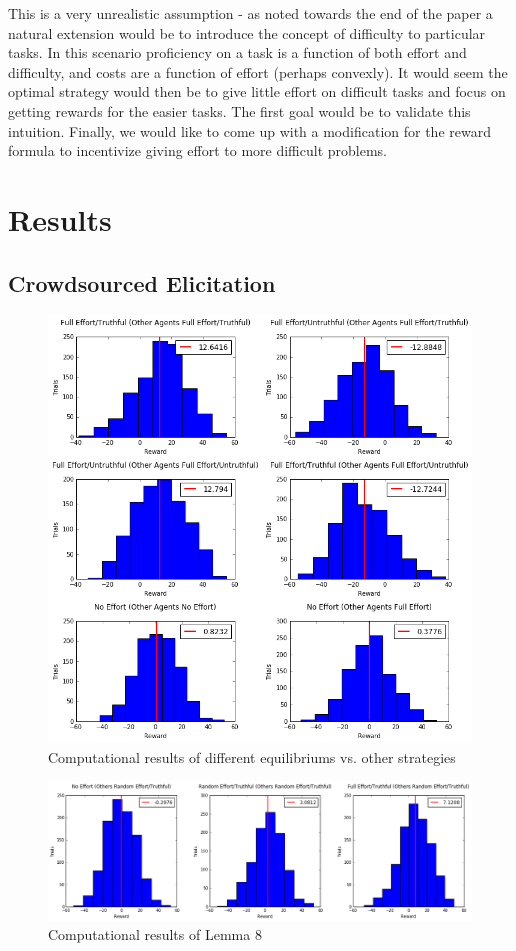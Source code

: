 \documentclass{scrartcl}
\begin{document}
This is a very unrealistic assumption - as noted towards the end of the paper a natural extension would be to introduce the concept of difficulty to particular tasks. In this scenario proficiency on a task is a function of both effort and difficulty, and costs are a function of effort (perhaps convexly). It would seem the optimal strategy would then be to give little effort on difficult tasks and focus on getting rewards for the easier tasks. The first goal would be to validate this intuition. Finally, we would like to come up with a modification for the reward formula to incentivize giving effort to more difficult problems.


\section{Results}
\subsection{Crowdsourced Elicitation}
\begin{figure}
	\caption{Computational results of different equilibriums vs. other strategies}
	\centering
	\includegraphics[width=1.0\textwidth]{cs_equilibriums}
\end{figure}
\begin{figure}
	\caption{Computational results of Lemma 8}
	\centering
	\includegraphics[width=1.0\textwidth]{cs_lemma8}
\end{figure}
\end{document}
